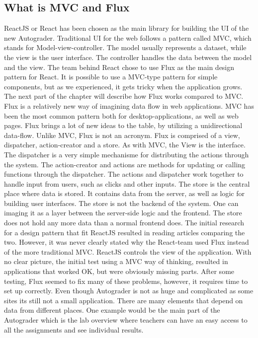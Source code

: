 \subsection{What is MVC and Flux}
ReactJS or React has been chosen as the main library for building the UI of the new Autograder. Traditional UI for the web follows a pattern called MVC, which stands for Model-view-controller. The model usually represents a dataset, while the view is the user interface. The controller handles the data between the model and the view. The team behind React chose to use Flux as the main design pattern for React. It is possible to use a MVC-type pattern for simple components, but as we experienced, it gets tricky when the application grows. The next part of the chapter will describe how Flux works compared to MVC.
Flux is a relatively new way of imagining data flow in web applications. MVC has been the most common pattern both for desktop-applications, as well as web pages. Flux brings a lot of new ideas to the table, by utilizing a unidirectional data-flow. Unlike MVC, Flux is not an acronym. Flux is comprised of a view, dispatcher, action-creator and a store. As with MVC, the View is the interface. The dispatcher is a very simple mechanisme for distributing the actions through the system. The action-creator and actions are methods for updating or calling functions through the dispatcher. The actions and dispatcher work together to handle input from users, such as clicks and other inputs. The store is the central place where data is stored. It contains data from the server, as well as logic for building user interfaces. The store is not the backend of the system. One can imaging it as a layer between the server-side logic and the frontend. The store does not hold any more data than a normal frontend does.
 The initial research for a design pattern that fit ReactJS resulted in reading articles comparing the two. However, it was never clearly stated why the React-team used Flux instead of the more traditional MVC. ReactJS controls the view of the application. With no clear picture, the initial test using a MVC way of thinking, resulted in applications that worked OK, but were obviously missing parts. After some testing, Flux seemed to fix many of these problems, however, it requires time to set up correctly. Even though Autograder is not as huge and complicated as some sites its still not a small application. There are many elements that depend on data from different places. One example would be the main part of the Autograder which is the lab overview where teachers can have an easy access to all the assignments and see individual results. 
